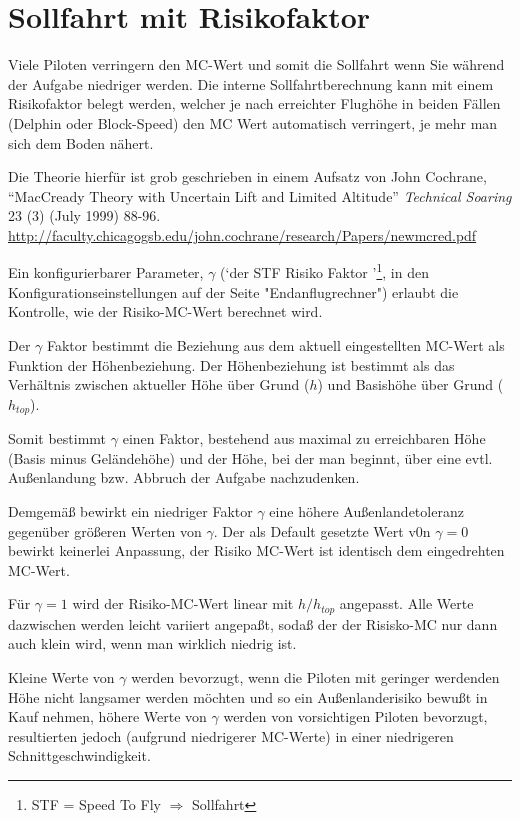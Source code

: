 \section{Sollfahrt  mit Risikofaktor}\label{sec:speed-fly-with}
Viele Piloten verringern den MC-Wert und somit die Sollfahrt wenn Sie während der Aufgabe niedriger werden.
 Die interne Sollfahrtberechnung kann mit einem Risikofaktor belegt werden, welcher je nach erreichter Flughöhe in beiden Fällen
 (Delphin oder Block-Speed) den MC Wert automatisch verringert, je mehr man sich dem Boden nähert.

Die Theorie hierfür ist grob geschrieben in einem Aufsatz von John
  Cochrane, ``MacCready Theory with Uncertain Lift and Limited
  Altitude'' {\em Technical Soaring} 23 (3) (July 1999) 88-96.
  \url{http://faculty.chicagogsb.edu/john.cochrane/research/Papers/newmcred.pdf}

Ein konfigurierbarer Parameter, $\gamma$ (`der STF Risiko Faktor '\footnote{STF  = Speed To Fly $\Rightarrow$  Sollfahrt},
in den Konfigurationseinstellungen auf der Seite "Endanflugrechner") erlaubt die Kontrolle, wie der Risiko-MC-Wert berechnet wird.

Der $\gamma$ Faktor bestimmt die Beziehung aus dem aktuell eingestellten MC-Wert als Funktion der Höhenbeziehung.
Der Höhenbeziehung ist bestimmt als das Verhältnis zwischen aktueller Höhe über Grund ($h$) und Basishöhe über Grund ($h_{top}$).

Somit bestimmt $\gamma$ einen Faktor, bestehend aus maximal zu erreichbaren Höhe (Basis minus Geländehöhe)
und der Höhe, bei der man beginnt, über eine evtl. Außenlandung bzw. Abbruch der Aufgabe nachzudenken.

Demgemäß bewirkt ein niedriger Faktor $\gamma$ eine höhere Außenlandetoleranz gegenüber größeren Werten von $\gamma$. Der als Default
gesetzte Wert v0n $\gamma=0$ bewirkt keinerlei  Anpassung, der Risiko MC-Wert ist identisch dem eingedrehten MC-Wert.

Für $\gamma=1$ wird der Risiko-MC-Wert linear mit $h/h_{top}$ angepasst.
Alle Werte dazwischen werden leicht variiert angepaßt, sodaß der der Risisko-MC nur dann auch klein wird, wenn man wirklich niedrig ist.

Kleine Werte von $\gamma$ werden bevorzugt, wenn die Piloten mit geringer werdenden Höhe nicht langsamer werden möchten und so ein
Außenlanderisiko bewußt in Kauf nehmen, höhere Werte von $\gamma$ werden von vorsichtigen Piloten bevorzugt,
resultierten jedoch (aufgrund niedrigerer MC-Werte) in einer niedrigeren Schnittgeschwindigkeit.

